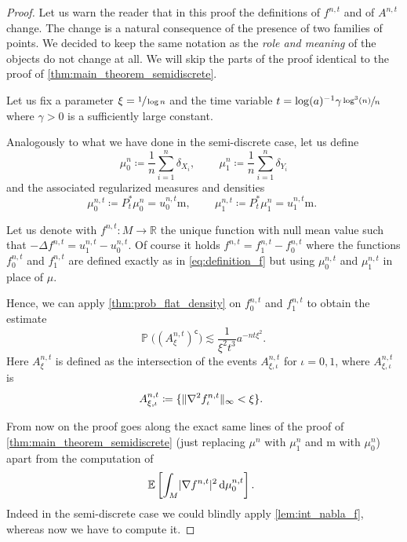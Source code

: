 \documentclass[JEP,XML,SOM,Unicode]{cedram}
\theoremstyle{plain}
\theoremstyle{definition}
\numberwithin{equation}{section}
\newcommand{\RR}{\ensuremath{\mathbb R}}
\renewcommand{\complement}{\ensuremath{\mathsf{c}}}\newcommand{\de}{\ensuremath{\,\mathrm d}}
\newcommand{\defeq}{\ensuremath{\coloneqq}}
\newcommand{\E}[1]{\ensuremath{\operatorname{\mathbb{E}}\left[#1\right]}}
\newcommand{\lapl}{\ensuremath{\Delta}}
\newcommand{\bP}[1]{\ensuremath{\operatorname{\mathbb{P}}\bigl(#1\bigr)}}
\renewcommand{\comma}{\ensuremath{\text{, }}}
\newcommand{\comma}{\ensuremath{\text{, }}}
\newcommand{\fullstop}{\ensuremath{\text{. }}}
\newcommand{\m}{\ensuremath{\mathrm m}}
\DeclarePairedDelimiter\abs{\lvert}{\rvert}
\DeclarePairedDelimiter\norm{\lVert}{\rVert}
\begin{document}
\begin{proof}
Let us warn the reader that in this proof the definitions of $f^{n,t}$ and of $A^{n,t}$ change.
The change is a natural consequence of the presence of two families of points. We decided to keep the same
notation as the \emph{role and meaning} of the objects do not change at all.
We will skip the parts of the proof identical to the proof of
\cref{thm:main_theorem_semidiscrete}.

Let us fix a parameter $\xi=\sfrac1{\log n}$ and the time variable
$t=\log(a)^{-1}\gamma\sfrac{\log^3(n)}{n}$ where $\gamma>0$ is a sufficiently large constant.

Analogously to what we have done in the semi-discrete case, let us define
\begin{equation*}
\mu_0^n \defeq \frac1n\sum_{i=1}^n \delta_{X_i} \comma \quad\quad
\mu_1^n \defeq \frac1n\sum_{i=1}^n \delta_{Y_i}
\end{equation*}
and the associated regularized measures and densities
\begin{equation*}
\mu_0^{n,t} \defeq P_t^*\mu_0^n = u_0^{n,t}\m \comma \quad\quad
\mu_1^{n,t} \defeq P_t^*\mu_1^n = u_1^{n,t}\m \fullstop
\end{equation*}

Let us denote with $f^{n,t}:M\to\RR$ the unique function with null mean value such that
$-\lapl f^{n,t} = u_1^{n,t}-u_0^{n,t}$. Of course it holds $f^{n,t} = f_1^{n,t}-f_0^{n,t}$ where the
functions $f_0^{n,t}$ and $f_1^{n,t}$ are defined exactly as in \cref{eq:definition_f} but using $\mu_0^{n,t}$ and $\mu_1^{n,t}$
in place of $\mu$.

Hence, we can apply \cref{thm:prob_flat_density} on $f_0^{n,t}$ and $f_1^{n,t}$ to obtain the estimate
\begin{equation*}
\bP{(A^{n,t}_\xi)^{\complement}} \lesssim \frac1{\xi^2t^3}a^{-nt\xi^2} \fullstop
\end{equation*}
Here $A^{n,t}_\xi$ is defined as the intersection of the events $A^{n,t}_{\xi,\iota}$ for $\iota=0, 1$, where $A^{n,t}_{\xi,\iota}$ is
\begin{equation*}
A^{n,t}_{\xi,\iota} \defeq \{\norm{\nabla^2f_\iota^{n,t}}_\infty < \xi\} \fullstop
\end{equation*}

From now on the proof goes along the exact same lines of the proof of \cref{thm:main_theorem_semidiscrete}
(just replacing $\mu^n$ with $\mu_1^n$ and $\m$ with $\mu_0^n$) apart from the computation of
\begin{equation*}
\E{\int_M \abs{\nabla f^{n,t}}^2\de\mu_0^{n,t} } \fullstop
\end{equation*}
Indeed in the semi-discrete case we could blindly apply \cref{lem:int_nabla_f}, whereas now we have to
compute it.


\end{proof}
\end{document}
